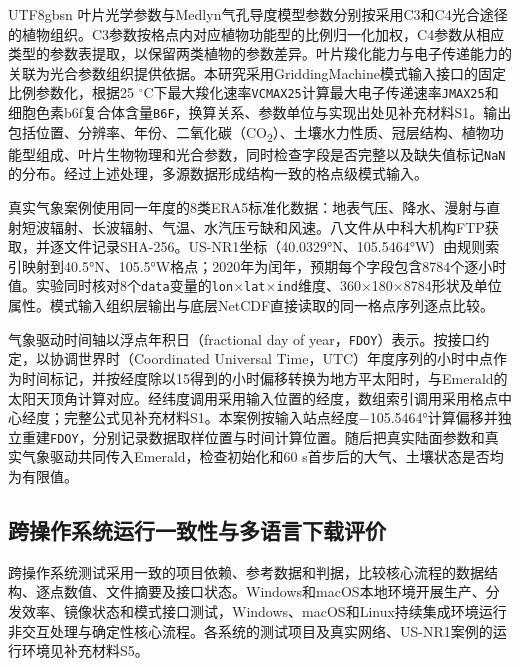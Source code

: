 \documentclass[numdoi]{chinese}
\begin{document}
\begin{CJK}{UTF8}{gbsn}
叶片光学参数与Medlyn气孔导度模型参数分别按采用C3和C4光合途径的植物组织\cite{ref3,ref4}。C3参数按格点内对应植物功能型的比例归一化加权，C4参数从相应类型的参数表提取，以保留两类植物的参数差异。叶片羧化能力与电子传递能力的关联为光合参数组织提供依据\cite{ref5}。本研究采用GriddingMachine模式输入接口的固定比例参数化，根据25 \ensuremath{{}^{\circ}\mathrm{C}}下最大羧化速率\nolinkurl{VCMAX25}计算最大电子传递速率\nolinkurl{JMAX25}和细胞色素b6f复合体含量\nolinkurl{B6F}，换算关系、\allowbreak{}参数单位与实现出处见补充材料S1。输出包括位置、\allowbreak{}分辨率、\allowbreak{}年份、\allowbreak{}二氧化碳（CO\textsubscript{2}）、\allowbreak{}土壤水力性质、\allowbreak{}冠层结构、\allowbreak{}植物功能型组成、\allowbreak{}叶片生物物理和光合参数，同时检查字段是否完整以及缺失值标记\nolinkurl{NaN}的分布。经过上述处理，多源数据形成结构一致的格点级模式输入。

真实气象案例使用同一年度的8类ERA5标准化数据\cite{ref6}：地表气压、\allowbreak{}降水、\allowbreak{}漫射与直射短波辐射、\allowbreak{}长波辐射、\allowbreak{}气温、\allowbreak{}水汽压亏缺和风速。八文件从中科大机构FTP获取，并逐文件记录SHA-256。US-NR1坐标（40.0329°N、\allowbreak{}105.5464°W）由规则索引映射到40.5°N、\allowbreak{}105.5°W格点；2020年为闰年，预期每个字段包含8784个逐小时值。实验同时核对8个\nolinkurl{data}变量的\texttt{lon\ensuremath{\times}lat\ensuremath{\times}ind}维度、\allowbreak{}360\ensuremath{\times}180\ensuremath{\times}8784形状及单位属性。模式输入组织层输出与底层NetCDF直接读取的同一格点序列逐点比较。

气象驱动时间轴以浮点年积日（fractional day of year，\nolinkurl{FDOY}）表示。按接口约定，以协调世界时（Coordinated Universal Time，UTC）年度序列的小时中点作为时间标记，并按经度除以15得到的小时偏移转换为地方平太阳时，与Emerald的太阳天顶角计算对应。经纬度调用采用输入位置的经度，数组索引调用采用格点中心经度；完整公式见补充材料S1。本案例按输入站点经度\ensuremath{-}105.5464°计算偏移并独立重建\nolinkurl{FDOY}，分别记录数据取样位置与时间计算位置。随后把真实陆面参数和真实气象驱动共同传入Emerald，检查初始化和60 s首步后的大气、\allowbreak{}土壤状态是否均为有限值。

\subsection{跨操作系统运行一致性与多语言下载评价}
跨操作系统测试采用一致的项目依赖、参考数据和判据，比较核心流程的数据结构、逐点数值、文件摘要及接口状态。Windows和macOS本地环境开展生产、分发效率、镜像状态和模式接口测试，Windows、macOS和Linux持续集成环境运行非交互处理与确定性核心流程。各系统的测试项目及真实网络、US-NR1案例的运行环境见补充材料S5。


\end{CJK}
\end{document}
